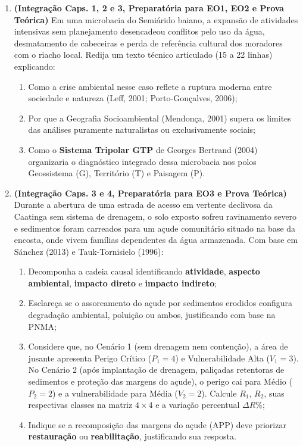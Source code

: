\begin{enumerate}[leftmargin=1.8em, itemsep=6pt, start=9]

  \item \textbf{(Integração Caps. 1, 2 e 3, Preparatória para EO1, EO2 e Prova Teórica)} Em uma microbacia do Semiárido baiano, a expansão de atividades intensivas sem planejamento desencadeou conflitos pelo uso da água, desmatamento de cabeceiras e perda de referência cultural dos moradores com o riacho local. Redija um texto técnico articulado (15 a 22 linhas) explicando:
  \begin{enumerate}[label=(\alph*), leftmargin=1.8em, itemsep=1.5pt]
    \item Como a crise ambiental nesse caso reflete a ruptura moderna entre sociedade e natureza (Leff, 2001; Porto-Gonçalves, 2006);
    \item Por que a Geografia Socioambiental (Mendonça, 2001) supera os limites das análises puramente naturalistas ou exclusivamente sociais;
    \item Como o \textbf{Sistema Tripolar GTP} de Georges Bertrand (2004) organizaria o diagnóstico integrado dessa microbacia nos polos Geossistema (G), Território (T) e Paisagem (P).
  \end{enumerate}
  \espacoResolucao[4.4cm]

  \item \textbf{(Integração Caps. 3 e 4, Preparatória para EO3 e Prova Teórica)} Durante a abertura de uma estrada de acesso em vertente declivosa da Caatinga sem sistema de drenagem, o solo exposto sofreu ravinamento severo e sedimentos foram carreados para um açude comunitário situado na base da encosta, onde vivem famílias dependentes da água armazenada. Com base em Sánchez (2013) e Tauk-Tornisielo (1996):
  \begin{enumerate}[label=(\alph*), leftmargin=1.8em, itemsep=1.5pt]
    \item Decomponha a cadeia causal identificando \textbf{atividade}, \textbf{aspecto ambiental}, \textbf{impacto direto} e \textbf{impacto indireto};
    \item Esclareça se o assoreamento do açude por sedimentos erodidos configura degradação ambiental, poluição ou ambos, justificando com base na PNMA;
    \item Considere que, no Cenário 1 (sem drenagem nem contenção), a área de jusante apresenta Perigo Crítico ($P_1 = 4$) e Vulnerabilidade Alta ($V_1 = 3$). No Cenário 2 (após implantação de drenagem, paliçadas retentoras de sedimentos e proteção das margens do açude), o perigo cai para Médio ($P_2 = 2$) e a vulnerabilidade para Média ($V_2 = 2$). Calcule $R_1$, $R_2$, suas respectivas classes na matriz $4 \times 4$ e a variação percentual $\Delta R\%$;
    \item Indique se a recomposição das margens do açude (APP) deve priorizar \textbf{restauração} ou \textbf{reabilitação}, justificando sua resposta.
  \end{enumerate}
  \espacoResolucao[4.4cm]

\end{enumerate}

